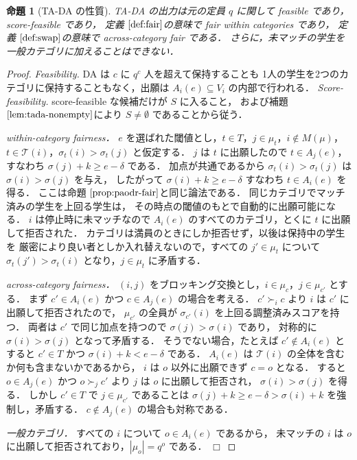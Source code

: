 \documentclass[
    12pt,          %
    a4paper,       %
    oneside,       %
    onecolumn,     %
    titlepage,     %
    final          %
]{jreport} %
\newcommand{\refdefinition}[1]{定義 $\ref{#1}$}
\newcommand{\refpropositional}[1]{命題 $\ref{#1}$}
\newcommand{\reflemma}[1]{補題 $\ref{#1}$}
\newtheorem{proof}{証明}[chapter]
\newtheorem{proposition}{命題}[chapter]
\newcommand{\qed}{\hfill $\Box$ \par}
\renewcommand{\T}{\mathcal{T}}   %
\begin{document}
\begin{proposition}[TA-DA の性質]
\label{prop:tada-props}
TA-DA の出力は元の定員 $q$ に関して feasible であり，score-feasible であり，
\refdefinition{def:fair}の意味で fair within categories であり，
\refdefinition{def:swap}の意味で across-category fair である．
さらに，未マッチの学生を一般カテゴリに加えることはできない．
\end{proposition}

\begin{proof}
\emph{Feasibility.}
DA は $c$ に $q^c$ 人を超えて保持することも
1人の学生を2つのカテゴリに保持することもなく，出願は $A_i(e)\subseteq V_i$ の内部で行われる．
\emph{Score-feasibility.}
score-feasible な候補だけが $S$ に入ること，
および\reflemma{lem:tada-nonempty}により $S\neq\emptyset$ であることから従う．

\emph{within-category fairness．}
$e$ を選ばれた閾値とし，$t\in T$，$j\in\mu_t$，$i\notin M(\mu)$，
$t\in\T(i)$，$\sigma_t(i)>\sigma_t(j)$ と仮定する．
$j$ は $t$ に出願したので $t\in A_j(e)$，すなわち $\sigma(j)+k\ge e-\delta$ である．
加点が共通であるから $\sigma_t(i)>\sigma_t(j)$ は $\sigma(i)>\sigma(j)$ を与え，
したがって $\sigma(i)+k\ge e-\delta$ すなわち $t\in A_i(e)$ を得る．
ここは\refpropositional{prop:paodr-fair}と同じ論法である．
同じカテゴリでマッチ済みの学生を上回る学生は，
その時点の閾値のもとで自動的に出願可能になる．
$i$ は停止時に未マッチなので $A_i(e)$ のすべてのカテゴリ，とくに $t$ に出願して拒否された．
カテゴリは満員のときにしか拒否せず，以後は保持中の学生を
厳密により良い者としか入れ替えないので，すべての $j'\in\mu_t$ について
$\sigma_t(j')>\sigma_t(i)$ となり，$j\in\mu_t$ に矛盾する．

\emph{across-category fairness．}
$(i,j)$ をブロッキング交換とし，$i\in\mu_c$，$j\in\mu_{c'}$ とする．
まず $c'\in A_i(e)$ かつ $c\in A_j(e)$ の場合を考える．
$c'\succ_i c$ より $i$ は $c'$ に出願して拒否されたので，
$\mu_{c'}$ の全員が $\sigma_{c'}(i)$ を上回る調整済みスコアを持つ．
両者は $c'$ で同じ加点を持つので $\sigma(j)>\sigma(i)$ であり，
対称的に $\sigma(i)>\sigma(j)$ となって矛盾する．
そうでない場合，たとえば $c'\notin A_i(e)$ とすると $c'\in T$ かつ $\sigma(i)+k<e-\delta$ である．
$A_i(e)$ は $\T(i)$ の全体を含むか何も含まないかであるから，
$i$ は $o$ 以外に出願できず $c=o$ となる．
すると $o\in A_j(e)$ かつ $o\succ_j c'$ より $j$ は $o$ に出願して拒否され，
$\sigma(i)>\sigma(j)$ を得る．
しかし $c'\in T$ で $j\in\mu_{c'}$ であることは
$\sigma(j)+k\ge e-\delta>\sigma(i)+k$ を強制し，矛盾する．
$c\notin A_j(e)$ の場合も対称である．

\emph{一般カテゴリ．}
すべての $i$ について $o\in A_i(e)$ であるから，
未マッチの $i$ は $o$ に出願して拒否されており，$|\mu_o|=q^o$ である．
\qed
\end{proof}
\end{document}
